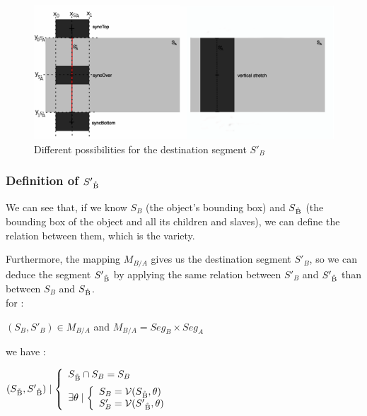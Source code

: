 \documentclass[a4paper]{article}
\newcommand{\variete}			{\ensuremath{\mathcal{V}}}
\begin{document}
\begin{figure}[h]
\begin{center}
\includegraphics[width=16cm]{img/top_over_bottomF3.png}
\caption{Different possibilities for the destination segment $S'_B$}
\label{fig:possibleDestRect}
\end{center}
\end{figure}


\subsubsection{Definition of $S'\textsubscript{\r{B}}$}\label{subsubsec:defDestChildRect}

We can see that, if we know $S_B$ (the object's bounding box) and $S\textsubscript{\r{B}}$ (the bounding box of the object and all its children and slaves), we can define the relation between them, which is the variety. 

Furthermore, the mapping $M_{B/A}$ gives us the destination segment $S'_B$, so we can deduce the segment $S'\textsubscript{\r{B}}$ by applying the same relation between $S'_B$ and $S'\textsubscript{\r{B}}$ than between $S_B$ and $S\textsubscript{\r{B}}$.
\\

for : \begin{center} $(S_B, S'_B) \in M_{B/A}$ and $M_{B/A} = Seg_B \times Seg_A$ \end{center}

we have :

\begin{center}
$(S\textsubscript{\r{B}}, S'\textsubscript{\r{B}}) \mid \left\lbrace 
\begin{array}{lcl} 
  S\textsubscript{\r{B}} \cap S_B = S_B\\ [0.2cm]
  \exists \theta \mid \left\lbrace
  \begin{array}{lcl}
    S_B = \variete(S\textsubscript{\r{B}}, \theta)\\%
    S'_B = \variete(S'\textsubscript{\r{B}}, \theta)
  \end{array}\right.
\end{array}\right.$
\end{center}
\end{document}
